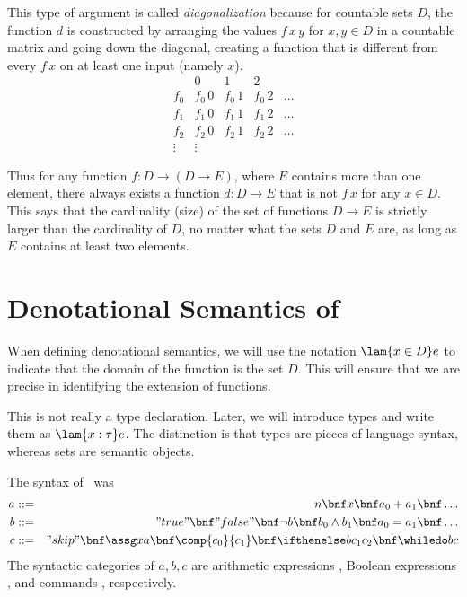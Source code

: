 This type of argument is called \emph{diagonalization} because for countable sets $D$, the function $d$ is constructed by arranging the values $f\,x\,y$ for $x,y\in D$ in a countable matrix and going down the diagonal, creating a function that is different from every $f\,x$ on at least one input (namely $x$).
\[
\begin{array}{r|cccc}
& 0 & 1 & 2 & \\ \hline
f_{0} & f_{0}\,0 & f_{0}\,1 & f_{0}\,2 & \ldots\\
f_{1} & f_{1}\,0 & f_{1}\,1 & f_{1}\,2 & \ldots\\
f_{2} & f_{2}\,0 & f_{2}\,1 & f_{2}\,2 & \ldots\\
\vdots & \vdots
\end{array}
\]

Thus for any function $f:D\to(D\to E)$, where $E$ contains more than one element, there always exists a function $d:D\to E$ that is not $f\,x$ for any $x\in D$. This says that the cardinality (size) of the set of functions $D\to E$ is strictly larger than the cardinality of $D$, no matter what the sets $D$ and $E$ are, as long as $E$ contains at least two elements.
 
\section{Denotational Semantics of \IMP}
\label{sec:denotationalIMP}

When defining denotational semantics, we will use the notation $\lam{x\in D}e$ to indicate that the domain of the function is the set $D$. This will ensure that we are precise in identifying the extension of functions.

This is not really a type declaration. Later, we will introduce types and write them as $\lam{x:\tau}e$.
The distinction is that types are pieces of language syntax, whereas sets are semantic objects.

The syntax of \IMP\ was
\begin{eqnarray*}
a &::=& n \bnf x \bnf a_0+a_1 \bnf \ldots\\
b &::=& "true" \bnf "false" \bnf \neg b \bnf b_0\wedge b_1 \bnf a_0=a_1 \bnf \ldots \\
c &::=& "skip" \bnf \assg xa \bnf \comp{c_0}{c_1} \bnf \ifthenelse b{c_1}{c_2} \bnf \whiledo bc
\end{eqnarray*}
The syntactic categories of $a,b,c$ are arithmetic expressions \AExp, Boolean expressions \BExp, and commands \Com, respectively.

